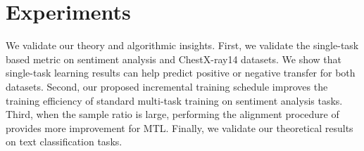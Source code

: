 \section{Experiments}

\vspace{-0.05in}
We validate our theory and algorithmic insights.
First, we validate the single-task based metric on sentiment analysis and ChestX-ray14 datasets.
We show that single-task learning results can help predict positive or negative transfer for both datasets.
Second, our proposed incremental training schedule improves the training efficiency of standard multi-task training on sentiment analysis tasks.
Third, when the sample ratio is large, performing the alignment procedure of \cite{WZR20} provides more improvement for MTL.
Finally, we validate our theoretical results on text classification tasks.

